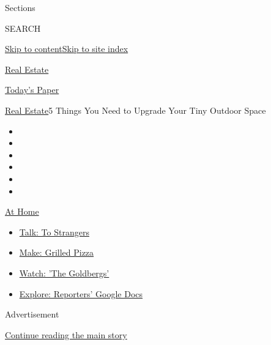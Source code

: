 Sections

SEARCH

\protect\hyperlink{site-content}{Skip to
content}\protect\hyperlink{site-index}{Skip to site index}

\href{https://www.nytimes.com/section/realestate}{Real Estate}

\href{https://myaccount.nytimes.com/auth/login?response_type=cookie\&client_id=vi}{}

\href{https://www.nytimes.com/section/todayspaper}{Today's Paper}

\href{/section/realestate}{Real Estate}\textbar{}5 Things You Need to
Upgrade Your Tiny Outdoor Space

\begin{itemize}
\item
\item
\item
\item
\item
\item
\end{itemize}

\href{https://www.nytimes.com/spotlight/at-home?action=click\&pgtype=Article\&state=default\&region=TOP_BANNER\&context=at_home_menu}{At
Home}

\begin{itemize}
\tightlist
\item
  \href{https://www.nytimes.com/2020/08/03/well/family/the-benefits-of-talking-to-strangers.html?action=click\&pgtype=Article\&state=default\&region=TOP_BANNER\&context=at_home_menu}{Talk:
  To Strangers}
\item
  \href{https://www.nytimes.com/2020/08/01/at-home/coronavirus-make-pizza-on-a-grill.html?action=click\&pgtype=Article\&state=default\&region=TOP_BANNER\&context=at_home_menu}{Make:
  Grilled Pizza}
\item
  \href{https://www.nytimes.com/2020/07/31/arts/television/goldbergs-abc-stream.html?action=click\&pgtype=Article\&state=default\&region=TOP_BANNER\&context=at_home_menu}{Watch:
  'The Goldbergs'}
\item
  \href{https://www.nytimes.com/interactive/2020/at-home/even-more-reporters-editors-diaries-lists-recommendations.html?action=click\&pgtype=Article\&state=default\&region=TOP_BANNER\&context=at_home_menu}{Explore:
  Reporters' Google Docs}
\end{itemize}

Advertisement

\protect\hyperlink{after-top}{Continue reading the main story}

